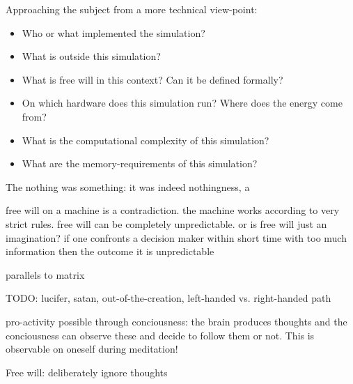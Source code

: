 \documentclass{article}
\begin{document}
Approaching the subject from a more technical view-point:

\begin{itemize}
\item Who or what implemented the simulation?
\item What is outside this simulation?
\item What is free will in this context? Can it be defined formally?
\item On which hardware does this simulation run? Where does the energy come from?
\item What is the computational complexity of this simulation?
\item What are the memory-requirements of this simulation?
\end{itemize}


The nothing was something: it was indeed nothingness, a

free will on a machine is a contradiction. the machine works according to very strict rules. free will can be completely unpredictable. or is free will just an imagination? if one confronts a decision maker within short time with too much information then the outcome it is unpredictable 

parallels to matrix

TODO: lucifer, satan, out-of-the-creation, left-handed vs. right-handed path

pro-activity possible through conciousness: the brain produces thoughts and the conciousness can observe these and decide to follow them or not. This is observable on oneself during meditation!

Free will: deliberately ignore thoughts
\end{document}
